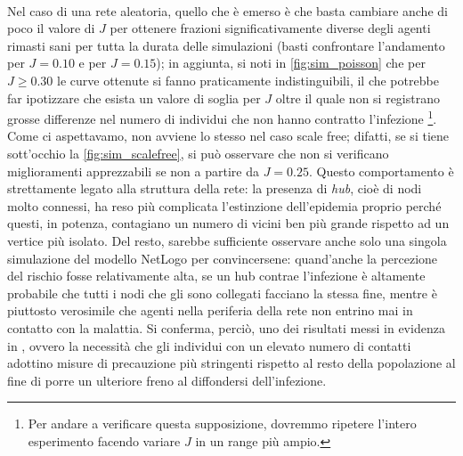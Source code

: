 \\Nel caso di una rete aleatoria, quello che è emerso è che basta cambiare anche di poco il valore di $ J $ per ottenere frazioni significativamente diverse degli agenti rimasti sani per tutta la durata delle simulazioni (basti confrontare l'andamento per $ J = 0.10 $ e per $ J = 0.15 $); in aggiunta, si noti in \cref{fig:sim_poisson} che per $ J \geq 0.30 $ le curve ottenute si fanno praticamente indistinguibili, il che potrebbe far ipotizzare che esista un valore di soglia per $ J $ oltre il quale non si registrano grosse differenze nel numero di individui che non hanno contratto l'infezione \footnote{Per andare a verificare questa supposizione, dovremmo ripetere l'intero esperimento facendo variare $ J $ in un range più ampio.}. \\Come ci aspettavamo, non avviene lo stesso nel caso scale free; difatti, se si tiene sott'occhio la \cref{fig:sim_scalefree}, si può osservare che non si verificano miglioramenti apprezzabili se non a partire da $ J = 0.25 $. Questo comportamento è strettamente legato alla struttura della rete: la presenza di \emph{hub}, cioè di nodi molto connessi, ha reso più complicata l'estinzione dell'epidemia proprio perché questi, in potenza, contagiano un numero di vicini ben più grande rispetto ad un vertice più isolato. Del resto, sarebbe sufficiente osservare anche solo una singola simulazione del modello NetLogo per convincersene: quand'anche la percezione del rischio fosse relativamente alta, se un hub contrae l'infezione è altamente probabile che tutti i nodi che gli sono collegati facciano la stessa fine, mentre è piuttosto verosimile che agenti nella periferia della rete non entrino mai in contatto con la malattia. Si conferma, perciò, uno dei risultati messi in evidenza in \cite{Bagnoli2007}, ovvero la necessità che gli individui con un elevato numero di contatti adottino misure di precauzione più stringenti rispetto al resto della popolazione al fine di porre un ulteriore freno al diffondersi dell'infezione.